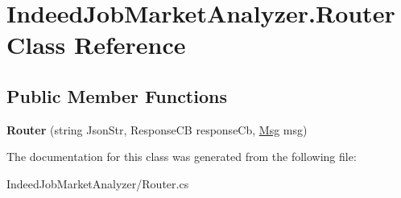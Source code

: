 \hypertarget{class_indeed_job_market_analyzer_1_1_router}{}\section{Indeed\+Job\+Market\+Analyzer.\+Router Class Reference}
\label{class_indeed_job_market_analyzer_1_1_router}
\subsection*{Public Member Functions}
\begin{DoxyCompactItemize}
\item 
\hypertarget{class_indeed_job_market_analyzer_1_1_router_ac1a56286d6e5b3faffbfb1332b3d13da}{}{\bfseries Router} (string Json\+Str, Response\+C\+B response\+Cb, \hyperlink{class_msg}{Msg} msg)\label{class_indeed_job_market_analyzer_1_1_router_ac1a56286d6e5b3faffbfb1332b3d13da}

\end{DoxyCompactItemize}


The documentation for this class was generated from the following file\+:\begin{DoxyCompactItemize}
\item 
Indeed\+Job\+Market\+Analyzer/Router.\+cs\end{DoxyCompactItemize}

